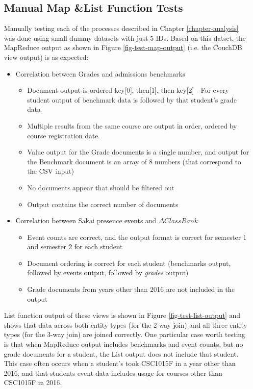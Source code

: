 \subsection{Manual Map \&List Function Tests}
Manually testing each of the processes described in Chapter \ref{chapter-analysis} was done using small dummy datasets with just 5 IDs. Based on this datset, the MapReduce output as shown in Figure \ref{fig-test-map-output} (i.e. the CouchDB view output) is as expected:

\begin{itemize}
  \item Correlation between Grades and admissions benchmarks
        \begin{itemize}
          \item Document output is ordered key[0], then[1], then key[2] - For every student output of benchmark data is followed by that student's grade data
          \item Multiple results from the same course are output in order, ordered by course registration date.
          \item Value output for the Grade documents is a single number, and output for the Benchmark document is an array of 8 numbers (that correspond to the CSV input)
          \item No documents appear that should be filtered out
          \item Output contains the correct number of documents
        \end{itemize}
  \item Correlation between Sakai presence events and $\Delta ClassRank$
        \begin{itemize}
          \item Event counts are correct, and the output format is correct for semester 1 and semester 2 for each student
          \item Document ordering is correct for each student (benchmarks output, followed by events output, followed by \textit{grades} output)
          \item Grade documents from years other than 2016 are not included in the output
        \end{itemize}
\end{itemize}

List function output of these views is shown in Figure \ref{fig-test-list-output} and shows that data across both entity types (for the 2-way join) and all three entity types (for the 3-way join) are joined correctly. One particular case worth testing is that when MapReduce output includes benchmarks and event counts, but no grade documents for a student, the List output does not include that student. This case often occurs when a student's took CSC1015F in a year other than 2016, and that students event data includes usage for courses other than CSC1015F in 2016.

